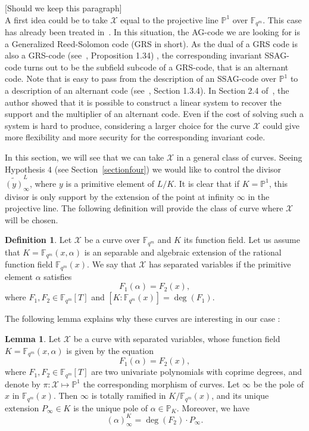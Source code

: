 \documentclass[10pt]{article}
\theoremstyle{definition}
\newtheorem{def1}[thm]{Definition}
\newtheorem{lem1}[thm]{Lemma}
\theoremstyle{definition}
\theoremstyle{definition}
\newcommand{\s}{\vspace{0.3cm}}
\newcommand{\cd}{\cdot}
\newcommand{\PP}{\mathbb{P}}
\newcommand{\fqm}{\mathbb{F}_{q^m}}
\newcommand{\X}{\mathcal{X}}
\begin{document}
\s

\color{blue} [Should we keep this paragraph] \\
A first idea could be to take $\X$ equal to the projective line $\PP^1$ over $\fqm$. This case has already been treated in~\cite{Bar}. In this situation, the AG-code we are looking for is a Generalized Reed-Solomon code (GRS in short). As the dual of a GRS code is also a GRS-code (see~\cite{Bar}, Proposition 1.34) , the corresponding invariant SSAG-code turns out to be the subfield subcode of a  GRS-code, that is an alternant code. Note that is easy to pass from the description of an SSAG-code over $\PP^1$ to a description of an alternant code (see~\cite{Bar}, Section 1.3.4). In Section 2.4 of~\cite{Bar}, the author showed that it is possible to construct a linear system to recover the support and the multiplier of an alternant code. Even if the cost of solving such a system is hard to produce, considering a larger choice for the curve $\X$ could give more flexibility and more security for the corresponding invariant code.
\color{black}

\s

\color{purple}
In this section, we will see that we can take $\X$ in a general class of curves. Seeing Hypothesis $4$ (see Section~\ref{sectionfour}) we would like to control the divisor $\widetilde{(y)}^L_{\infty}$, where $y$ is a primitive element of $L/K$. It is clear that if $K=\PP^1$, this divisor is only support by the extension of the point at infinity $\infty$ in the projective line. The following definition will provide the class of curve where $\X$ will be chosen.
\color{black}

\s

\begin{def1} \label{courbes a variables separees}
Let $\X$ be a curve over $\fqm$ and $K$ its function field. Let us assume that $K=\fqm(x,\alpha)$ is an separable and algebraic extension of the rational function field $\fqm(x)$. We say that $\X$ has separated variables if the primitive element $\alpha$ satisfies
\[F_1(\alpha) = F_2(x),\]
where $F_1,F_2 \in \fqm[T]$ and $[K:\fqm(x)] = \deg({F_1})$.
\end{def1}

\s

The following lemma explains why these curves are interesting in our case :

\s

\begin{lem1} \label{lemdegre}
Let $\X$ be a curve with separated variables, whose function field $K=\fqm(x,\alpha)$ is given by the equation
\[F_1(\alpha) = F_2(x),\]
where $F_1,F_2 \in \fqm[T]$ are two univariate polynomials with coprime degrees, and denote by $\pi : \X \longmapsto \PP^1$  the corresponding morphism of curves. Let $\infty$ be the pole of $x$ in $\fqm(x)$. Then $\infty$ is totally ramified in $K/\fqm(x)$, and its unique extension $P_{\infty} \in K$ is the unique pole of $\alpha \in \PP_K$. Moreover, we have 
\[(\alpha)^K_{\infty} = \deg{(F_2) \cd P_{\infty}}.\]
\end{lem1}
\end{document}
